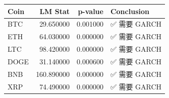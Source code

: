 \begin{tabular}{lrrl}
\toprule
Coin & LM Stat & p-value & Conclusion \\
\midrule
BTC & 29.650000 & 0.001000 & ✅ 需要 GARCH \\
ETH & 64.030000 & 0.000000 & ✅ 需要 GARCH \\
LTC & 98.420000 & 0.000000 & ✅ 需要 GARCH \\
DOGE & 31.140000 & 0.000600 & ✅ 需要 GARCH \\
BNB & 160.890000 & 0.000000 & ✅ 需要 GARCH \\
XRP & 74.490000 & 0.000000 & ✅ 需要 GARCH \\
\bottomrule
\end{tabular}
